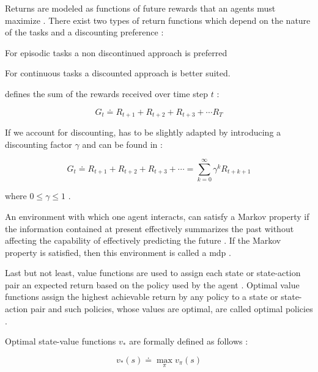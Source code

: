 \documentclass{seal_thesis}
\begin{document}
Returns are modeled as functions of future rewards that an agents must maximize \cite[p. 73]{Sutton2017}. There exist two types of return functions which depend on the nature of the tasks and a discounting preference \cite[p. 73]{Sutton2017}:
\begin{enumerate*}
	\item For episodic tasks a non discontinued approach is preferred
	\item For continuous tasks a discounted approach is better suited.
\end{enumerate*}

 defines the sum of the rewards received over time step $t$ \cite[p. 73]{Sutton2017}:

\begin{equation}
\label{eq:expected_return}
	G_t  \doteq R_{t+1} + R_{t+2} + R_{t+3} + \cdots R_{T}
\end{equation}

If we account for discounting,  has to be slightly adapted by introducing a discounting factor $\gamma$ and can be found in :

\begin{equation}
\label{eq:expected_discounted_return}
	G_t  \doteq R_{t+1} + R_{t+2} + R_{t+3} + \cdots = \sum_{k=0}^\infty \gamma^k R_{t+k+1}
\end{equation}

where $0 \leq \gamma \leq 1$ \cite[p. 73]{Sutton2017}.

An environment  with which one agent interacts, can satisfy a Markov property if the information contained at present effectively summarizes the past without affecting the capability of effectively predicting the future \cite[p. 73]{Sutton2017}. If the Markov property is satisfied, then this environment is called a \gls{mdp} \cite[p. 73]{Sutton2017}.

Last but not least, value functions are used to assign each state or state-action pair an expected return based on the policy used by the agent \cite[p. 74]{Sutton2017}. Optimal value functions assign the highest achievable return by any policy to a state or state-action pair  and such policies, whose values are optimal, are called optimal policies \cite[p. 74]{Sutton2017}.

Optimal state-value functions $v_*$ are formally defined as follows \cite[p. 74]{Sutton2017}:

\begin{equation}
	v_* (s) \doteq \max_\pi v_\pi (s)
\end{equation}
\end{document}
